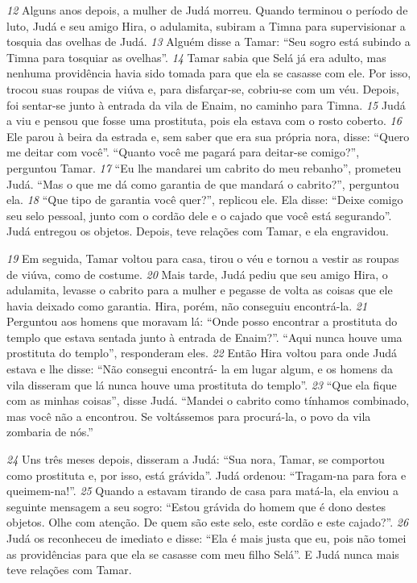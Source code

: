 \bigskip      
\textit{\tiny 12}
Alguns anos depois, a mulher de Judá morreu. Quando terminou o período
de luto, Judá e seu amigo Hira, o adulamita, subiram a Timna para supervisionar a
tosquia das ovelhas de Judá. 
\textit{\tiny 13}
Alguém disse a Tamar: “Seu sogro está subindo a
Timna para tosquiar as ovelhas”.
\textit{\tiny 14}
Tamar sabia que Selá já era adulto, mas nenhuma providência havia sido
tomada para que ela se casasse com ele. Por isso, trocou suas roupas de viúva e,
para disfarçar-se, cobriu-se com um véu. Depois, foi sentar-se junto à entrada da
vila de Enaim, no caminho para Timna. 
\textit{\tiny 15}
Judá a viu e pensou que fosse uma
prostituta, pois ela estava com o rosto coberto. 
\textit{\tiny 16}
Ele parou à beira da estrada e,
sem saber que era sua própria nora, disse: “Quero me deitar com você”.
   “Quanto você me pagará para deitar-se comigo?”, perguntou Tamar.
\textit{\tiny 17}
“Eu lhe mandarei um cabrito do meu rebanho”, prometeu Judá.
   “Mas o que me dá como garantia de que mandará o cabrito?”, perguntou ela.
\textit{\tiny 18}
“Que tipo de garantia você quer?”, replicou ele.
   Ela disse: “Deixe comigo seu selo pessoal, junto com o cordão dele e o cajado
que você está segurando”. Judá entregou os objetos. Depois, teve relações com
Tamar, e ela engravidou. 

\bigskip
\textit{\tiny 19}
Em seguida, Tamar voltou para casa, tirou o véu e
tornou a vestir as roupas de viúva, como de costume.
\textit{\tiny 20}
Mais tarde, Judá pediu que seu amigo Hira, o adulamita, levasse o cabrito para
a mulher e pegasse de volta as coisas que ele havia deixado como garantia. Hira,
porém, não conseguiu encontrá-la. 
\textit{\tiny 21}
Perguntou aos homens que moravam lá:
“Onde posso encontrar a prostituta do templo que estava sentada junto à entrada
de Enaim?”.
   “Aqui nunca houve uma prostituta do templo”, responderam eles.
\textit{\tiny 22}
Então Hira voltou para onde Judá estava e lhe disse: “Não consegui encontrá-
la em lugar algum, e os homens da vila disseram que lá nunca houve uma
prostituta do templo”.
\textit{\tiny 23}
“Que ela fique com as minhas coisas”, disse Judá. “Mandei o cabrito como
tínhamos combinado, mas você não a encontrou. Se voltássemos para procurá-la,
o povo da vila zombaria de nós.”

\bigskip   
\textit{\tiny 24}
Uns três meses depois, disseram a Judá: “Sua nora, Tamar, se comportou
como prostituta e, por isso, está grávida”.
   Judá ordenou: “Tragam-na para fora e queimem-na!”.
\textit{\tiny 25}
Quando a estavam tirando de casa para matá-la, ela enviou a seguinte
mensagem a seu sogro: “Estou grávida do homem que é dono destes objetos. Olhe
com atenção. De quem são este selo, este cordão e este cajado?”.
\textit{\tiny 26}
Judá os reconheceu de imediato e disse: “Ela é mais justa que eu, pois não
tomei as providências para que ela se casasse com meu filho Selá”. E Judá nunca
mais teve relações com Tamar.
   
